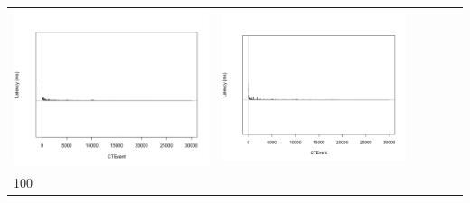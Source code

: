 \begin{table}[htbp]
{\begin{tabular}{l | ccccc}
\begin{minipage}{.15\textwidth}
				\vspace{2pt}
     			 	\includegraphics[width=\linewidth]{images/lat-log-graph/I2}
    				\end{minipage}
    			   & \begin{minipage}{.15\textwidth}
     			 	
				\vspace{2pt}
     			 	\includegraphics[width=\linewidth]{images/lat-log-graph/I6}
    				 \end{minipage}\\		
		100	   & \begin{minipage}{.15\textwidth}
     			 	

\end{minipage}
\end{tabular}}
\end{table}
